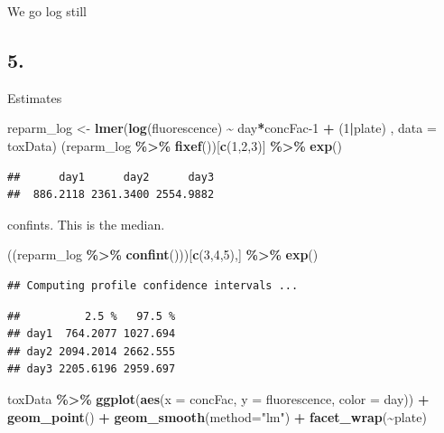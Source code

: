 \documentclass[
]{article}
\newenvironment{Shaded}{\begin{snugshade}}{\end{snugshade}}
\newcommand{\AttributeTok}[1]{\textcolor[rgb]{0.13,0.29,0.53}{#1}}
\newcommand{\DecValTok}[1]{\textcolor[rgb]{0.00,0.00,0.81}{#1}}
\newcommand{\FunctionTok}[1]{\textcolor[rgb]{0.13,0.29,0.53}{\textbf{#1}}}
\newcommand{\NormalTok}[1]{#1}
\newcommand{\OtherTok}[1]{\textcolor[rgb]{0.56,0.35,0.01}{#1}}
\newcommand{\SpecialCharTok}[1]{\textcolor[rgb]{0.81,0.36,0.00}{\textbf{#1}}}
\newcommand{\StringTok}[1]{\textcolor[rgb]{0.31,0.60,0.02}{#1}}
\begin{document}
We go log still

\hypertarget{section-3}{%
\subsection{5.}\label{section-3}}

Estimates

\begin{Shaded}
\begin{Highlighting}[]
\NormalTok{reparm\_log }\OtherTok{\textless{}{-}} \FunctionTok{lmer}\NormalTok{(}\FunctionTok{log}\NormalTok{(fluorescence) }\SpecialCharTok{\textasciitilde{}}\NormalTok{ day}\SpecialCharTok{*}\NormalTok{concFac}\DecValTok{{-}1} \SpecialCharTok{+}\NormalTok{ (}\DecValTok{1}\SpecialCharTok{|}\NormalTok{plate) , }\AttributeTok{data =}\NormalTok{ toxData)}
\NormalTok{(reparm\_log }\SpecialCharTok{\%\textgreater{}\%} \FunctionTok{fixef}\NormalTok{())[}\FunctionTok{c}\NormalTok{(}\DecValTok{1}\NormalTok{,}\DecValTok{2}\NormalTok{,}\DecValTok{3}\NormalTok{)] }\SpecialCharTok{\%\textgreater{}\%} \FunctionTok{exp}\NormalTok{()}
\end{Highlighting}
\end{Shaded}

\begin{verbatim}
##      day1      day2      day3 
##  886.2118 2361.3400 2554.9882
\end{verbatim}

confints. This is the median.

\begin{Shaded}
\begin{Highlighting}[]
\NormalTok{((reparm\_log }\SpecialCharTok{\%\textgreater{}\%} \FunctionTok{confint}\NormalTok{()))[}\FunctionTok{c}\NormalTok{(}\DecValTok{3}\NormalTok{,}\DecValTok{4}\NormalTok{,}\DecValTok{5}\NormalTok{),] }\SpecialCharTok{\%\textgreater{}\%} \FunctionTok{exp}\NormalTok{()}
\end{Highlighting}
\end{Shaded}

\begin{verbatim}
## Computing profile confidence intervals ...
\end{verbatim}

\begin{verbatim}
##          2.5 %   97.5 %
## day1  764.2077 1027.694
## day2 2094.2014 2662.555
## day3 2205.6196 2959.697
\end{verbatim}

\begin{Shaded}
\begin{Highlighting}[]
\NormalTok{toxData }\SpecialCharTok{\%\textgreater{}\%} \FunctionTok{ggplot}\NormalTok{(}\FunctionTok{aes}\NormalTok{(}\AttributeTok{x =}\NormalTok{ concFac, }\AttributeTok{y =}\NormalTok{ fluorescence, }\AttributeTok{color =}\NormalTok{ day)) }\SpecialCharTok{+} \FunctionTok{geom\_point}\NormalTok{() }\SpecialCharTok{+} \FunctionTok{geom\_smooth}\NormalTok{(}\AttributeTok{method=}\StringTok{"lm"}\NormalTok{) }\SpecialCharTok{+} \FunctionTok{facet\_wrap}\NormalTok{(}\SpecialCharTok{\textasciitilde{}}\NormalTok{plate)}
\end{Highlighting}
\end{Shaded}
\end{document}

